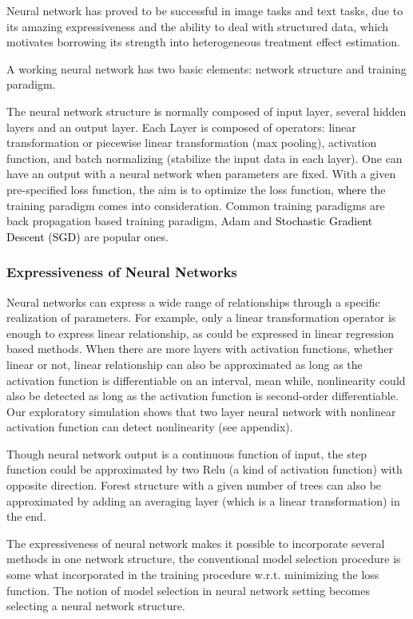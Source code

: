 \documentclass[11pt,paper=letter]{scrartcl}
\newcommand\hz[1]{\textcolor{black}{#1}}
\begin{document}
Neural network has proved to be successful in image tasks and text tasks, due to its amazing expressiveness and the ability to deal with structured data, which motivates borrowing its strength into heterogeneous treatment effect estimation.

A working neural network has two basic elements: network structure and training paradigm. 

The neural network structure \hz{is} normally composed of input layer, several hidden layers and an output layer. Each Layer is composed of operators: linear transformation or piecewise linear transformation (max pooling), activation function, and batch normalizing (stabilize the input data in each layer). One can have an output with a neural network when parameters are fixed. With a given pre-specified loss function, the aim is to optimize the loss function, \hz{where} the training paradigm comes into consideration. Common training paradigms are back propagation based training paradigm, Adam and \hz{Stochastic Gradient Descent (SGD)} are popular ones.

\subsubsection{Expressiveness of Neural Networks} 
Neural networks can express a wide range of relationships through a specific realization of parameters. For example, only a linear transformation operator is enough to express linear relationship, as could be expressed in linear regression based methods. When there are more layers with activation functions, whether linear or not, linear relationship can also be approximated as long as the activation function is differentiable on an interval, mean while, nonlinearity could also be detected as long as the activation function is second-order differentiable. Our exploratory simulation shows that two layer neural network with nonlinear activation function can detect nonlinearity (see appendix).

Though neural network output is a continuous function of input, the step function could be approximated by two Relu (a kind of activation function) with opposite direction. Forest structure with a given number of trees can also be approximated by adding an averaging layer (which is a linear transformation) in the end.

The expressiveness of neural network makes it possible to incorporate several methods in one network structure, the conventional model selection procedure is some what incorporated in the training procedure w.r.t. minimizing the loss function. The notion of model selection in neural network setting becomes selecting a neural network structure.
\end{document}
